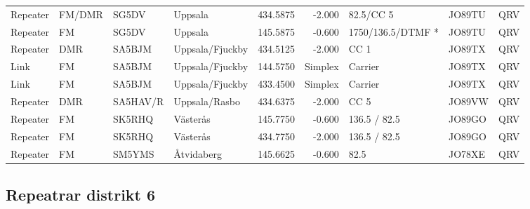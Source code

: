 {\begin{landscape}
\begin{longtable}{llllrrlll}
	Repeater          & FM/DMR     & SG5DV    & Uppsala              &     434.5875 &     -2.000 & 82.5/CC 5         & JO89TU      & QRV      \\
	Repeater          & FM         & SG5DV    & Uppsala              &     145.5875 &     -0.600 & 1750/136.5/DTMF * & JO89TU      & QRV      \\
	Repeater          & DMR        & SA5BJM   & Uppsala/Fjuckby      &     434.5125 &     -2.000 & CC 1              & JO89TX      & QRV      \\
	Link              & FM         & SA5BJM   & Uppsala/Fjuckby      &     144.5750 &    Simplex & Carrier           & JO89TX      & QRV      \\
	Link              & FM         & SA5BJM   & Uppsala/Fjuckby      &     433.4500 &    Simplex & Carrier           & JO89TX      & QRV      \\
	Repeater          & DMR        & SA5HAV/R & Uppsala/Rasbo        &     434.6375 &     -2.000 & CC 5              & JO89VW      & QRV      \\
	Repeater          & FM         & SK5RHQ   & Västerås             &     145.7750 &     -0.600 & 136.5 / 82.5      & JO89GO      & QRV      \\
	Repeater          & FM         & SK5RHQ   & Västerås             &     434.7750 &     -2.000 & 136.5 / 82.5      & JO89GO      & QRV      \\
	Repeater          & FM         & SM5YMS   & Åtvidaberg           &     145.6625 &     -0.600 & 82.5              & JO78XE      & QRV
\end{longtable}


\clearpage

\subsection{Repeatrar distrikt 6}



\end{landscape}}
